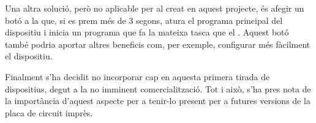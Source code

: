 Una altra solució, però no aplicable per al  creat en aquest
projecte, és afegir un botó a la  que, si es prem més de 3 segons,
atura el programa principal del dispositiu i inicia un programa que
fa la mateixa tasca que el . Aquest botó també podria aportar
altres beneficis com, per exemple, configurar més fàcilment el dispositiu.

Finalment s'ha decidit no incorporar cap  en aquesta primera
tirada de dispositius, degut a la no imminent comercialització. Tot i això, s'ha
pres nota de la importància d'aquest aspecte per a tenir-lo present per a
futures versions de la placa de circuit imprès.

